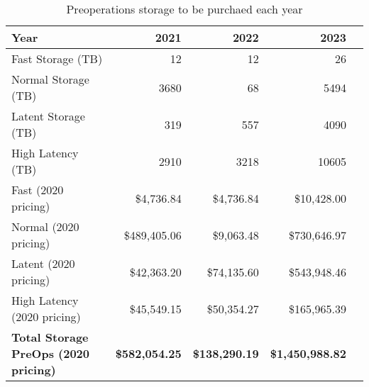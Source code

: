 \tiny \begin{longtable} { |p{}  |r  |r  |r  |r |} 
\caption{Preoperations storage to be purchaed each year \label{tab:preStorage}}\\ 
\hline 
\textbf{Year }&\textbf{2021}&\textbf{2022}&\textbf{2023} \\ \hline
{Fast Storage (TB)}&{12}&{12}&{26} \\ \hline
{Normal Storage (TB)}&{3680}&{68}&{5494} \\ \hline
{Latent Storage  (TB)}&{319}&{557}&{4090} \\ \hline
{High Latency (TB)}&{2910}&{3218}&{10605} \\ \hline
{Fast (2020 pricing)}&{\$4,736.84}&{\$4,736.84}&{\$10,428.00} \\ \hline
{Normal (2020 pricing)}&{\$489,405.06}&{\$9,063.48}&{\$730,646.97} \\ \hline
{Latent (2020 pricing)}&{\$42,363.20}&{\$74,135.60}&{\$543,948.46} \\ \hline
{High Latency (2020 pricing)}&{\$45,549.15}&{\$50,354.27}&{\$165,965.39} \\ \hline
\textbf{Total Storage PreOps (2020 pricing)}&\textbf{\$582,054.25}&\textbf{\$138,290.19}&\textbf{\$1,450,988.82} \\ \hline
\end{longtable} \normalsize
